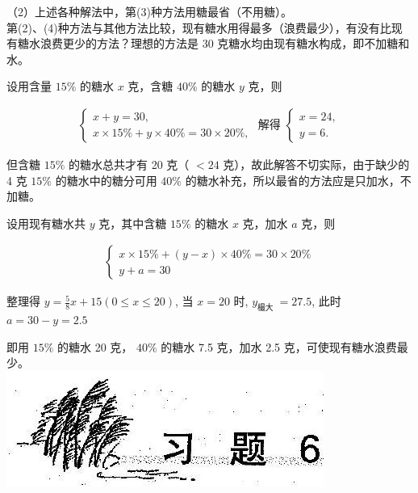 \documentclass[10pt]{article}
\begin{document}
（2）上述各种解法中，第(3)种方法用糖最省（不用糖）。\\
第(2)、(4)种方法与其他方法比较，现有糖水用得最多（浪费最少），有没有比现有糖水浪费更少的方法？理想的方法是 30 克糖水均由现有糖水构成，即不加糖和水。

设用含量 $15 \%$ 的糖水 $x$ 克，含糖 $40 \%$ 的糖水 $y$ 克，则

\begin{align*}
\left\{\begin{array} { l } 
{ x + y = 3 0 , } \\
{ x \times 1 5 \% + y \times 4 0 \% = 3 0 \times 2 0 \% , }
\end{array} \text { 解得 } \left\{\begin{array}{l}
x=24, \\
y=6 .
\end{array}\right.\right.
\end{align*}

但含糖 $15 \%$ 的糖水总共才有 20 克（ $<24$ 克），故此解答不切实际，由于缺少的 4 克 $15 \%$ 的糖水中的糖分可用 $40 \%$ 的糖水补充，所以最省的方法应是只加水，不加糖。

设用现有糖水共 $y$ 克，其中含糖 $15 \%$ 的糖水 $x$ 克，加水 $a$ 克，则

\begin{align*}
\left\{\begin{array}{l}
x \times 15 \%+(y-x) \times 40 \%=30 \times 20 \% \\
y+a=30
\end{array}\right.
\end{align*}

整理得 $y=\frac{5}{8} x+15(0 \leqslant x \leqslant 20)$, 当 $x=20$ 时, $y_{\text {樶大 }}=27.5$, 此时 $a=30-y=2.5$

即用 $15 \%$ 的糖水 20 克， $40 \%$ 的糖水 7.5 克，加水 2.5 克，可使现有糖水浪费最少。\\
\includegraphics[max width=\textwidth, center]{2024_10_30_26b590fd1106d28139f0g-039}
\end{document}
